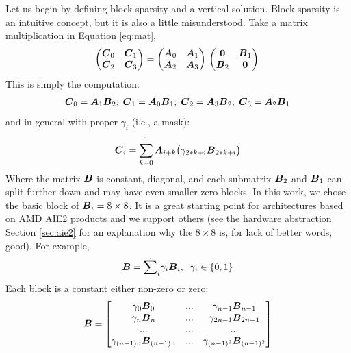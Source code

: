 \documentclass[conference]{IEEEtran}
\begin{document}
Let us begin by defining block sparsity and a vertical solution. Block
sparsity is an intuitive concept, but it is also a little
misunderstood. Take a matrix multiplication in Equation
\ref{eq:mat},
\begin{equation}
  \label{eq:mat}
  \begin{pmatrix}
    \Vc{C}_0 & \Vc{C}_1 \\
    \Vc{C}_2 & \Vc{C}_3 \\ 
  \end{pmatrix} = 
  \begin{pmatrix}
    \Vc{A}_0 & \Vc{A}_1 \\
    \Vc{A}_2 & \Vc{A}_3 \\ 
  \end{pmatrix}\\
  \begin{pmatrix}
    \Vc{0}   & \Vc{B}_1 \\
    \Vc{B}_2 & \Vc{0} \\ 
  \end{pmatrix}\\
\end{equation}
This is simply the computation: 
{\small \begin{equation}
  {\boldsymbol C}_0 = {\boldsymbol A}_{1} {\boldsymbol B}_{2}; \;
  {\boldsymbol C}_1 = {\boldsymbol A}_{0} {\boldsymbol B}_{1}; \;
  {\boldsymbol C}_2 = {\boldsymbol A}_{3} {\boldsymbol B}_{2}; \;
  {\boldsymbol C}_3 = {\boldsymbol A}_{2} {\boldsymbol B}_{1}
\end{equation}}
and in general with proper $\gamma_i$ (i.e., a mask):
\begin{equation}
  {\boldsymbol C}_i = \sum_{k=0}^1 {\boldsymbol A}_{i+ k} \big(\gamma_{2*k+i} {\boldsymbol B}_{2*k+i}\big)
\end{equation}
Where the matrix ${\boldsymbol B}$ is constant, diagonal, and each submatrix
${\boldsymbol B_2}$ and ${\boldsymbol B}_1$ can split further down and may have even
smaller zero blocks. In this work, we chose the basic block of
${\boldsymbol B}_i = 8\times 8$. It is a great starting point for architectures
based on AMD AIE2 products and we support others (see the hardware
abstraction Section \ref{sec:aie2} for an explanation why the $8\times 8$
is, for lack of better words, good).  For example,
\begin{equation}
  {\boldsymbol B} = \dot{\sum}_i \gamma_i {\boldsymbol B}_i, \;\; \gamma_i \in \{0,1\} 
\end{equation}
Each block is a constant either non-zero or zero:
{\small \begin{equation*}
  {\boldsymbol B} = 
  \begin{bmatrix}
    \gamma_0{\boldsymbol B}_0   &  ... &   \gamma_{n-1}{\boldsymbol B}_{n-1} \\
    \gamma_n{\boldsymbol B}_{n} &  ... &   \gamma_{2n-1}{\boldsymbol B}_{2n-1} \\
    ...               &  ... &   ... \\
    \gamma_{(n-1)n}{\boldsymbol B}_{(n-1)n} & ... &   \gamma_{(n-1)^2}{\boldsymbol B}_{(n-1)^2} \\
  \end{bmatrix}
\end{equation*}}
\end{document}
